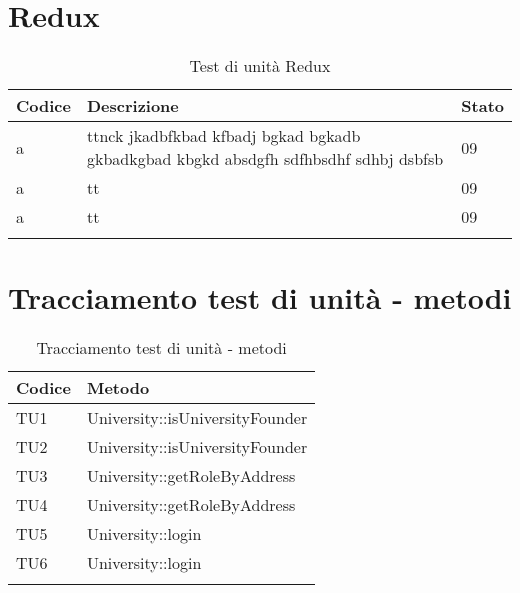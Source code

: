 \documentclass[PianoDiQualifica.tex]{subfiles}
\begin{document}
\section{Redux}
\begin{longtable}[H]{P{2cm}P{8.5cm}P{3cm}}
	\color{CHeaderText}\textbf{Codice} & 
	\color{CHeaderText}\textbf{Descrizione} & 
	\color{CHeaderText}\textbf{Stato}\\
	\endhead
	a & ttnck  jkadbfkbad kfbadj bgkad bgkadb gkbadkgbad kbgkd absdgfh sdfhbsdhf sdhbj dsbfsb & 09 \\ 
	a & tt & 09 \\
	a & tt & 09 \\
	\hiderowcolors
	\caption{Test di unità Redux}
\end{longtable}

\section{Tracciamento test di unità - metodi}
\begin{longtable}[H]{P{2cm}P{11.5cm}}
	\color{CHeaderText}\textbf{Codice} & 
	\color{CHeaderText}\textbf{Metodo} \\
	\endhead
	TU1 & University::isUniversityFounder \\ 
	TU2 & University::isUniversityFounder \\
	TU3 & University::getRoleByAddress \\
	TU4 & University::getRoleByAddress \\
	TU5 & University::login\\
	TU6 & University::login\\
	\hiderowcolors
	\caption{Tracciamento test di unità - metodi}
\end{longtable}
	
\end{document}
